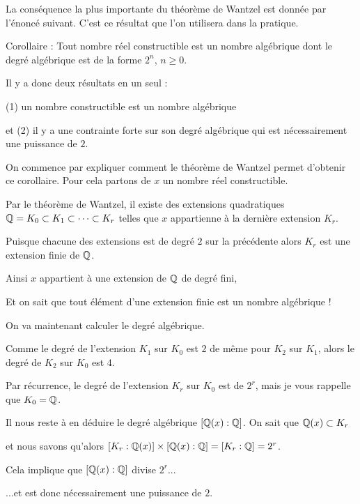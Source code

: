 \diapo


La conséquence la plus importante du théorème de Wantzel
est donnée par l'énoncé suivant. C'est ce résultat que l'on utilisera 
dans la pratique.

Corollaire :
Tout nombre réel constructible est un nombre algébrique
dont le degré algébrique est de la forme $2^n$, $n\ge 0$. 

Il y a donc deux résultats en un seul : 

(1) un nombre constructible est un nombre algébrique

et (2)  il y a une contrainte forte sur son degré algébrique qui est nécessairement une puissance de $2$.

\change
On commence par expliquer comment le théorème de Wantzel permet d'obtenir ce corollaire.
Pour cela partons de $x$ un nombre réel constructible. 

\change
Par le théorème de Wantzel, il existe des extensions quadratiques 
$\mathbb{Q} = K_0 \subset K_1 \subset \cdots \subset K_r$
telles que $x$ appartienne à la dernière extension $K_r$. 

\change
Puisque chacune des extensions est de degré $2$ sur la précédente 
alors $K_r$ est une extension finie de $\mathbb{Q}$.

Ainsi $x$ appartient à une extension de $\mathbb{Q}$ de degré fini,

\change
Et on sait que tout élément d'une extension finie est un nombre algébrique !

\change

On va maintenant calculer le degré algébrique.

Comme le degré de l'extension  $K_1$ sur $K_0$ est $2$
de même pour $K_2$ sur $K_1$, alors le degré de $K_2$ sur $K_0$ est $4$.

\change

Par récurrence, le degré de l'extension $K_r$ sur $K_0$ est de $2^r$, mais je vous rappelle que $K_0 = \mathbb{Q}$.

\change
Il nous reste à en déduire le degré algébrique $[\mathbb{Q}(x):\mathbb{Q}]$.
On sait que $\mathbb{Q}(x) \subset K_r$ 

et nous savons qu'alors  $[K_r:\mathbb{Q}(x)] \times [\mathbb{Q}(x):\mathbb{Q}]=[K_r:\mathbb{Q}]=2^r$.

\change
Cela implique que $[\mathbb{Q}(x):\mathbb{Q}]$ divise $2^r$...

\change
...et est donc nécessairement une puissance de $2$.

\diapo


